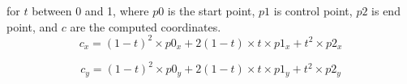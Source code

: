  for $t$ between 0 and 1, where $p0$ is the start point, $p1$ is control point, $p2$ is end point, and $c$ are the computed coordinates.
 $$
 c_x = (1-t)^2 \times p0_x + 2(1-t) \times t \times p1_x + t^2 \times p2_x
 $$

 $$
 c_y = (1-t)^2 \times p0_y + 2(1-t) \times t \times p1_y + t^2 \times p2_y
 $$
\bye
